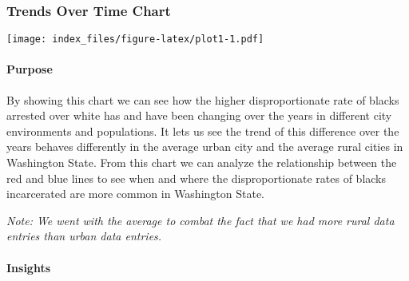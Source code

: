 \documentclass[
]{article}
\begin{document}
\hypertarget{trends-over-time-chart}{%
\subsubsection{Trends Over Time Chart}\label{trends-over-time-chart}}

\texttt{[image: index\_files/figure-latex/plot1-1.pdf]}

\hypertarget{purpose}{%
\paragraph{Purpose}\label{purpose}}

By showing this chart we can see how the higher disproportionate rate of
blacks arrested over white has and have been changing over the years in
different city environments and populations. It lets us see the trend of
this difference over the years behaves differently in the average urban
city and the average rural cities in Washington State. From this chart
we can analyze the relationship between the red and blue lines to see
when and where the disproportionate rates of blacks incarcerated are
more common in Washington State.

\emph{Note: We went with the average to combat the fact that we had more
rural data entries than urban data entries.}

\hypertarget{insights}{%
\paragraph{Insights}\label{insights}}
\end{document}

